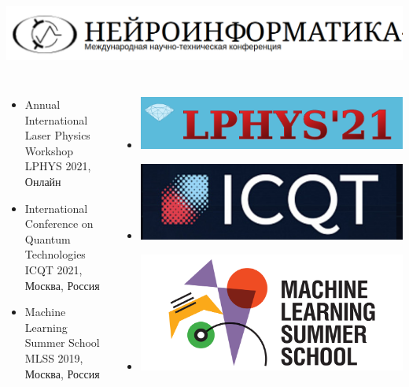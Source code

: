 \begin{frame}[t,allowframebreaks]
\begin{columns}
\includegraphics[width=1\linewidth]{Presentation/images/logo/neuroinfo.png}
\end{columns}

\begin{columns}
\begin{itemize}
\vspace{40pt}
\setlength\itemsep{1.5em}
    \item[] Annual International Laser Physics Workshop\\
    LPHYS 2021, Онлайн
    \item[] International Conference on Quantum Technologies\\
    ICQT 2021, Москва, Россия
    \item[] Machine Learning Summer School\\
    MLSS 2019, Москва, Россия
\end{itemize} 

\vspace{50pt}
\begin{itemize}
\setlength\itemsep{1.5em}
    \item[] {\includegraphics[width=1\linewidth]{Presentation/images/logo/lphys.png}}
    \item[] {\includegraphics[width=1\linewidth]{Presentation/images/logo/icqt.png}}
    \item[] {\includegraphics[width=1\linewidth]{Presentation/images/logo/mlss.png}}
\end{itemize}

\end{columns}

\end{frame}
